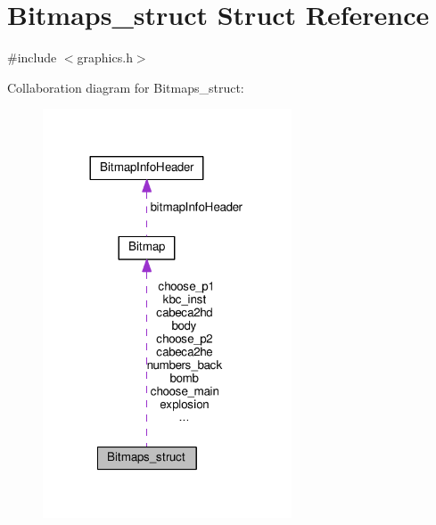 \hypertarget{structBitmaps__struct}{}\section{Bitmaps\+\_\+struct Struct Reference}
\label{structBitmaps__struct}


{\ttfamily \#include $<$graphics.\+h$>$}



Collaboration diagram for Bitmaps\+\_\+struct\+:
\nopagebreak
\begin{figure}[H]
\begin{center}
\leavevmode
\includegraphics[width=209pt]{structBitmaps__struct__coll__graph}
\end{center}
\end{figure}
